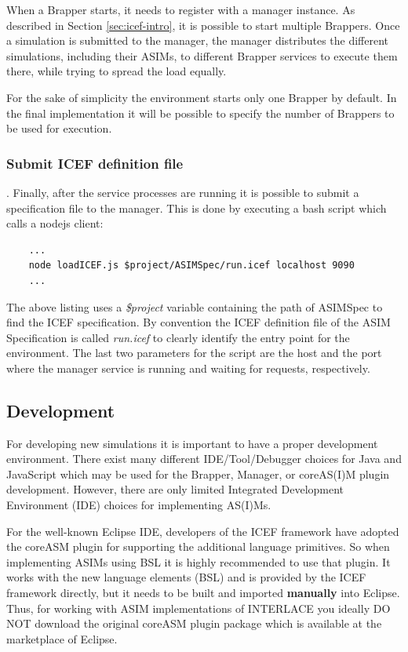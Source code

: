 When a Brapper starts, it needs to register with a manager instance. As described in Section \ref{sec:icef-intro}, it is possible to start multiple Brappers. Once a simulation is submitted to the manager, the manager distributes the different simulations, including their ASIMs, to different Brapper services to execute them there, while trying to spread the load equally.

For the sake of simplicity the environment starts only one Brapper by default. In the final implementation it will be possible to specify the number of Brappers to be used for execution.

\subsubsection{Submit ICEF definition file}. Finally, after the service processes are running it is possible to submit a specification file to the manager. This is done by executing a bash script which calls a  nodejs client:

\begin{lstlisting}
	...
	node loadICEF.js $project/ASIMSpec/run.icef localhost 9090
	...
\end{lstlisting}

The above listing uses a \textit{\$project} variable containing the path of ASIMSpec to find the ICEF specification. By convention the ICEF definition file of the ASIM Specification is called \textit{run.icef} to clearly identify the entry point for the environment. The last two parameters for the script are the host and the port where the manager service is running and waiting for requests, respectively.

\subsection{Development}
\label{sec:development}
For developing new simulations it is important to have a proper development environment. There exist many different IDE/Tool/Debugger choices for Java and JavaScript which may be used for the Brapper, Manager, or coreAS(I)M plugin development. However, there are only limited Integrated Development Environment (IDE) choices for implementing AS(I)Ms.

For the well-known Eclipse IDE, developers of the ICEF framework have adopted the coreASM plugin for supporting the additional language primitives. So when implementing ASIMs using BSL it is highly recommended to use that plugin. It works with the new language elements (BSL) and is provided by the ICEF framework directly, but it needs to be built and imported \textbf{manually} into Eclipse. Thus, for working with ASIM implementations of INTERLACE you ideally DO NOT download the original coreASM plugin package which is available at the marketplace of Eclipse.

